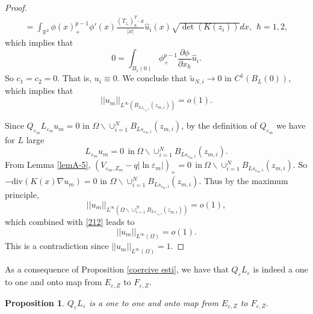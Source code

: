 \documentclass[12pt,reqno]{amsart}
\numberwithin{equation}{section}
\newtheorem{proposition}[theorem]{Proposition}
\theoremstyle{definition}
\theoremstyle{remark}
\begin{document}
\begin{proof}
\begin{equation*}
\begin{split}
=\int_{\mathbb{R}^2}\phi(x)^{p-1}_+\phi'(x)\frac{(T_{z_{i}})_\hbar^T\cdot x}{|x|}\hat{u}_{i}(x)\sqrt{\det(K(z_i))}dx,\ \  \hbar=1,2,
\end{split}
\end{equation*}
which implies that
\begin{equation}\label{211}
0=\int_{B_1(0)}\phi^{p-1}_+\frac{\partial \phi}{\partial x_\hbar}\hat{u}_i.
\end{equation}
So $ c_1=c_2=0. $ That is, $ u_i\equiv 0. $ We conclude that $ \tilde{u}_{N,i}\to 0 $ in  $ C^1(B_L(0)) $, which implies that
\begin{equation}\label{212}
||u_m||_{L^\infty(B_{Ls_{\varepsilon_m,i}}(z_{m,i}))}=o(1).
\end{equation}

Since $ Q_{\varepsilon_m} L_{\varepsilon_m} u_m = 0 $ in $ \Omega \backslash\cup_{i=1}^NB_{Ls_{\varepsilon_m,i}}(z_{m,i}) $, by the definition of $  Q_{\varepsilon_m} $ we have for $ L $ large
\begin{equation*}
 L_{\varepsilon_m} u_m = 0\  \ \text{in} \ \Omega \backslash\cup_{i=1}^NB_{Ls_{\varepsilon_m,i}}(z_{m,i}).
\end{equation*}
From Lemma \ref{lemA-5},  $ (V_{\varepsilon_m,Z_m}-q|\ln\varepsilon_m|)_+=0\  \ \text{in} \ \Omega \backslash\cup_{i=1}^NB_{Ls_{\varepsilon_m,i}}(z_{m,i}). $
So $ -\text{div}(K(x)\nabla u_m)=0 $ in $ \Omega \backslash\cup_{i=1}^NB_{Ls_{\varepsilon_m,i}}(z_{m,i}). $
Thus by the maximum principle, 
\begin{equation*}
||u_m||_{L^\infty(\Omega\backslash \cup_{i=1}^NB_{Ls_{\varepsilon_m,i}}(z_{m,i}))}=o(1),
\end{equation*}
which combined with \eqref{212} leads to
\begin{equation*}
||u_m||_{L^\infty(\Omega)}=o(1).
\end{equation*}
This is a contradiction since $ ||u_m||_{L^\infty(\Omega)}=1. $



\end{proof}


As a  consequence of Proposition \ref{coercive esti}, we have that $ Q_\varepsilon L_\varepsilon $ is indeed a one to one and onto map from $ E_{\varepsilon,Z} $ to $ F_{\varepsilon, Z}. $
\begin{proposition}\label{one to one and onto}
$ Q_\varepsilon L_\varepsilon $ is  a one to one and onto map from $ E_{\varepsilon,Z} $ to $ F_{\varepsilon, Z}. $
\end{proposition}
\end{document}
